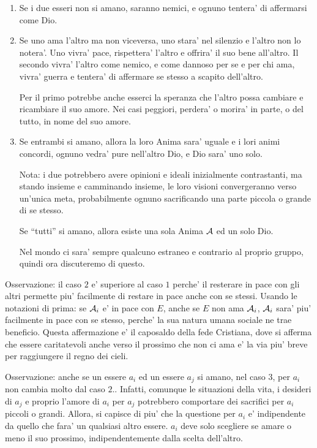     \begin{enumerate}

        \item Se i due esseri non si amano, saranno nemici, e ognuno tentera' di affermarsi come Dio.

        \item Se uno ama l'altro ma non viceversa, uno stara' nel silenzio e l'altro non lo notera'. Uno vivra' pace, rispettera' l'altro e offrira' il suo bene all'altro. Il secondo vivra' l'altro come nemico, e come dannoso per se e per chi ama, vivra' guerra e tentera' di affermare se stesso a scapito dell'altro.
            
            Per il primo potrebbe anche esserci la speranza che l'altro possa cambiare e ricambiare il suo amore. Nei casi peggiori, perdera' o morira' in parte, o del tutto, in nome del suo amore.

        \item Se entrambi si amano, allora la loro Anima sara' uguale e i lori animi concordi, ognuno vedra' pure nell'altro Dio, e Dio sara' uno solo.

                Nota: i due potrebbero avere opinioni e ideali inizialmente contrastanti, ma stando insieme e camminando insieme, le loro visioni convergeranno verso un'unica meta, probabilmente ognuno sacrificando una parte piccola o grande di se stesso.

                Se ``tutti'' si amano, allora esiste una sola Anima $\mathcal{A}$ ed un solo Dio.

                Nel mondo ci sara' sempre qualcuno estraneo e contrario al proprio gruppo, quindi ora discuteremo di questo.
    \end{enumerate}

Osservazione: il caso $2$ e' superiore al caso $1$ perche' il resterare in pace con gli altri permette piu' facilmente di restare in pace anche con se stessi. Usando le notazioni di prima: se $\mathcal{A}_i$ e' in pace con $E$, anche se $E$ non ama $\mathcal{A}_i$, $\mathcal{A}_i$ sara' piu' facilmente in pace con se stesso, perche' la sua natura umana sociale ne trae beneficio.
Questa affermazione e' il caposaldo della fede Cristiana, dove si afferma che essere caritatevoli anche verso il prossimo che non ci ama e' la via piu' breve per raggiungere il regno dei cieli.

Osservazione: anche se un essere $a_i$ ed un essere $a_j$ si amano, nel caso $3$, per $a_i$ non cambia molto dal caso $2.$. Infatti, comunque le situazioni della vita, i desideri di $a_j$ e proprio l'amore di $a_i$ per $a_j$ potrebbero comportare dei sacrifici per $a_i$ piccoli o grandi. Allora, si capisce di piu' che la questione per $a_i$ e' indipendente da quello che fara' un qualsiasi altro essere. $a_i$ deve solo scegliere se amare o meno il suo prossimo, indipendentemente dalla scelta dell'altro.

